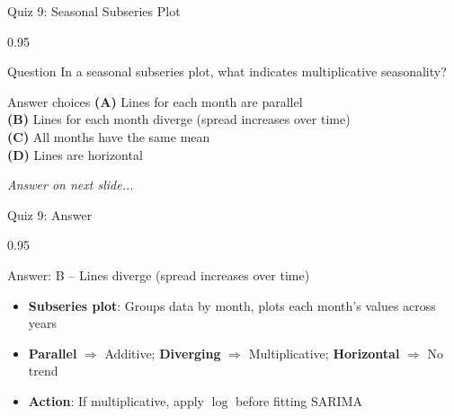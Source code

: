 \documentclass[9pt, aspectratio=169, t]{beamer}
\begin{document}
\begin{frame}{Quiz 9: Seasonal Subseries Plot}
    \begin{cminipage}{0.95\textwidth}
    \begin{alertblock}{Question}
        In a seasonal subseries plot, what indicates multiplicative seasonality?
    \end{alertblock}

    \vspace{0.4cm}

    \begin{block}{Answer choices}
        \textcolor{MainBlue}{\textbf{(A)}} Lines for each month are parallel\\[3pt]
        \textcolor{MainBlue}{\textbf{(B)}} Lines for each month diverge (spread increases over time)\\[3pt]
        \textcolor{MainBlue}{\textbf{(C)}} All months have the same mean\\[3pt]
        \textcolor{MainBlue}{\textbf{(D)}} Lines are horizontal
    \end{block}

    \vspace{0.5cm}

    \begin{center}
        \textit{Answer on next slide...}
    \end{center}
    \end{cminipage}
\end{frame}

\begin{frame}{Quiz 9: Answer}
    \begin{cminipage}{0.95\textwidth}
    \begin{exampleblock}{Answer: B -- Lines diverge (spread increases over time)}
        \begin{itemize}
            \item \textbf{Subseries plot}: Groups data by month, plots each month's values across years
            \item \textbf{Parallel} $\Rightarrow$ Additive; \textbf{Diverging} $\Rightarrow$ Multiplicative; \textbf{Horizontal} $\Rightarrow$ No trend
            \item \textbf{Action}: If multiplicative, apply $\log$ before fitting SARIMA
        \end{itemize}
    \end{exampleblock}

    \end{cminipage}
\end{frame}
\end{document}
